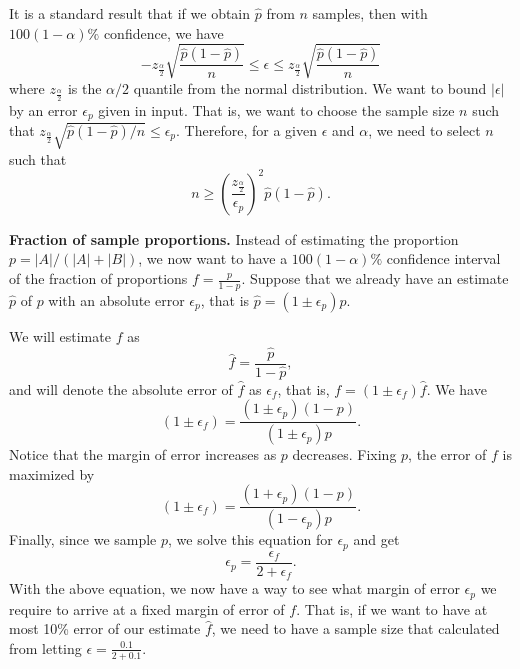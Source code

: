 \documentclass[a4paper,11pt]{article}
\begin{document}
It is a standard result \cite{??} that if we obtain $\hat{p}$ from $n$ samples, then with $100(1-\alpha)\%$ confidence, we have 
\[- z_{\frac{\alpha}{2}}\sqrt{\frac{\hat{p}(1-\hat{p})}{n}} \leq \epsilon \leq z_{\frac{\alpha}{2}}\sqrt{\frac{\hat{p}(1-\hat{p})}{n}} \]
where $z_{\frac{\alpha}{2}}$ is the $\alpha/2$ quantile from the normal distribution. We want to bound $|\epsilon|$ by an error $\epsilon_p$ given in input. That is, we want to choose the sample size $n$ such that $z_{\frac{\alpha}{2}}\sqrt{\hat{p}(1-\hat{p})/n} \leq \epsilon_p$. Therefore, for a given $\epsilon$ and $\alpha$, we need to select $n$ such that
\begin{equation}
	n \geq \left(\frac{z_{\frac{\alpha}{2}}}{\epsilon_p}\right)^2\hat{p}(1-\hat{p}).
\end{equation}




\noindent \textbf{Fraction of sample proportions.} Instead of estimating the proportion $p = |A| / (|A| + |B|)$, we now want to have a $100(1-\alpha)\%$ confidence interval of the fraction of proportions $f =\frac{p}{1-p}$.
Suppose that we already have an estimate $\hat{p}$ of $p$ with an absolute error $\epsilon_p$, that is $\hat{p} = (1 \pm \epsilon_p)p$. 

We will estimate $f$ as
\begin{equation*}
 	\hat{f} = \frac{\hat{p}}{1-\hat{p}},
\end{equation*} 
and will denote the absolute error of $\hat{f}$ as $\epsilon_f$, that is, $f = (1 \pm \epsilon_f) \hat{f}$. We have
\begin{equation*}
 	(1\pm \epsilon_f) = \frac{(1\pm \epsilon_p)(1-p)}{(1\pm \epsilon_p)p}. 
 \end{equation*} 
Notice that the margin of error increases as $p$ decreases. Fixing $p$, the error of $f$ is maximized by  
\begin{equation*}
 	(1\pm \epsilon_f) = \frac{(1 + \epsilon_p)(1-p)}{(1- \epsilon_p)p}. 
 \end{equation*} 
 Finally, since we sample $p$, we solve this equation for $\epsilon_p$ and get
\begin{equation}
 	\epsilon_p = \frac{\epsilon_f}{2 + \epsilon_f}. 
 \end{equation}
With the above equation, we now have a way to see what margin of error $\epsilon_p$ we require to arrive at a fixed margin of error of $f$. That is, if we want to have at most 10\% error of our estimate $\hat{f}$, we need to have a sample size that calculated from letting $\epsilon = \frac{0.1}{2 + 0.1}$.
\end{document}
